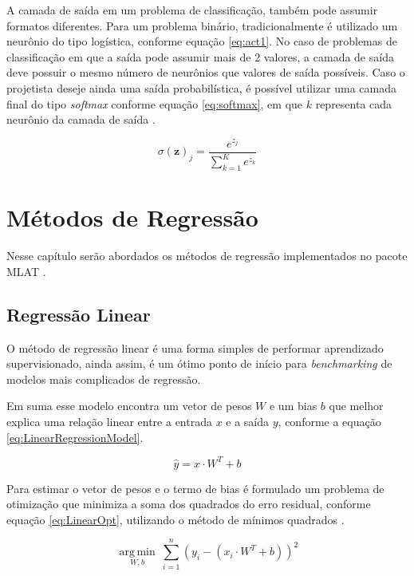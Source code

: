 A camada de saída em um problema de classificação, também pode assumir formatos diferentes. Para um problema binário, tradicionalmente é utilizado um neurônio do tipo logística, conforme equação \ref{eq:act1}.  No caso de problemas de classificação em que a saída pode assumir mais de 2 valores, a camada de saída deve possuir o mesmo  número de neurônios que valores de saída possíveis. Caso o projetista deseje ainda uma saída probabilística, é possível utilizar uma camada final do tipo \textit{softmax} conforme equação \ref{eq:softmax}, em que $k$ representa cada neurônio da camada de saída \cite{Goodfellow-et-al-2016}.  

\begin{equation}
\label{eq:softmax}
\sigma (\mathbf {z} )_{j}={\frac {e^{z_{j}}}{\sum _{k=1}^{K}e^{z_{k}}}}
\end{equation}

\section{Métodos de Regressão}
Nesse capítulo serão abordados os métodos de regressão implementados no pacote MLAT \cite{PauloCirinoMLAT}. 


\subsection{Regressão Linear}
O método de regressão linear é uma forma simples de performar aprendizado supervisionado, ainda assim, é um ótimo ponto de início para \textit{benchmarking} de modelos mais complicados de regressão. 

Em suma esse modelo encontra um vetor de pesos $W$ e um bias $b$ que melhor explica uma relação linear entre a entrada $x$ e a saída $y$, conforme a equação \ref{eq:LinearRegressionModel}.

\begin{equation}
\hat{y}= {x \cdot W^T} + b
\label{eq:LinearRegressionModel}
\end{equation}

Para estimar o vetor de pesos e o termo de bias é formulado um problema de otimização que minimiza a soma dos quadrados do erro residual, conforme equação  \ref{eq:LinearOpt}, utilizando o método de mínimos quadrados \cite{James20131}.

\begin{equation}
\underset {W, b}{\operatorname {arg\,min} }\ \sum_{i=1}^{n} ({y_i -  (x_i \cdot W^T+ b) })^2
\label{eq:LinearOpt}
\end{equation}

